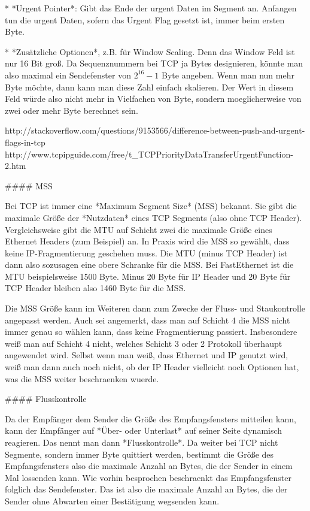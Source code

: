 * *Urgent Pointer*: Gibt das Ende der urgent Daten im Segment an. Anfangen tun
  die urgent Daten, sofern das Urgent Flag gesetzt ist, immer beim ersten Byte.

* *Zusätzliche Optionen*, z.B. für Window Scaling. Denn das Window Feld ist nur
  16 Bit groß. Da Sequenznummern bei TCP ja Bytes designieren, könnte man also
  maximal ein Sendefenster von $2^16 - 1$ Byte angeben. Wenn man nun mehr Byte
  möchte, dann kann man diese Zahl einfach skalieren. Der Wert in diesem Feld
  würde also nicht mehr in Vielfachen von Byte, sondern moeglicherweise von
  zwei oder mehr Byte berechnet sein.

http://stackoverflow.com/questions/9153566/difference-between-push-and-urgent-flags-in-tcp
http://www.tcpipguide.com/free/t_TCPPriorityDataTransferUrgentFunction-2.htm

#### MSS

Bei TCP ist immer eine *Maximum Segment Size* (MSS) bekannt. Sie gibt die
maximale Größe der *Nutzdaten* eines TCP Segments (also ohne TCP
Header). Vergleichsweise gibt die MTU auf Schicht zwei die maximale Größe eines
Ethernet Headers (zum Beispiel) an. In Praxis wird die MSS so gewählt, dass
keine IP-Fragmentierung geschehen muss. Die MTU (minus TCP Header) ist dann also
sozusagen eine obere Schranke für die MSS. Bei FastEthernet ist die MTU
beispielsweise 1500 Byte. Minus 20 Byte für IP Header und 20 Byte für TCP Header
bleiben also 1460 Byte für die MSS.

Die MSS Größe kann im Weiteren dann zum Zwecke der Fluss- und Staukontrolle
angepasst werden. Auch sei angemerkt, dass man auf Schicht 4 die MSS nicht immer
genau so wählen kann, dass keine Fragmentierung passiert. Insbesondere weiß man
auf Schicht 4 nicht, welches Schicht 3 oder 2 Protokoll überhaupt angewendet
wird. Selbst wenn man weiß, dass Ethernet und IP genutzt wird, weiß man dann
auch noch nicht, ob der IP Header vielleicht noch Optionen hat, was die MSS
weiter beschraenken wuerde.

#### Flusskontrolle

Da der Empfänger dem Sender die Größe des Empfangsfensters mitteilen kann, kann
der Empfänger auf *Über- oder Unterlast* auf seiner Seite dynamisch
reagieren. Das nennt man dann *Flusskontrolle*. Da weiter bei TCP nicht
Segmente, sondern immer Byte quittiert werden, bestimmt die Größe des
Empfangsfensters also die maximale Anzahl an Bytes, die der Sender in einem Mal
lossenden kann. Wie vorhin besprochen beschraenkt das Empfangsfenster folglich
das Sendefenster. Das ist also die maximale Anzahl an Bytes, die der Sender ohne
Abwarten einer Bestätigung wegsenden kann.

